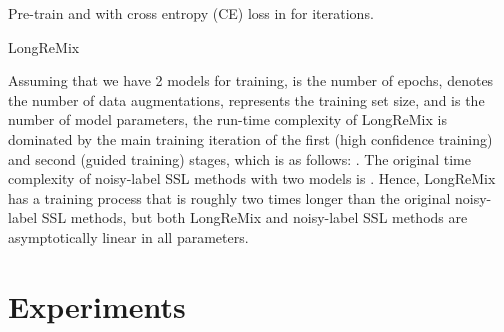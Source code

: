 \documentclass[review]{elsarticle}
\begin{document}
\begin{algorithm}[t!]
\scriptsize


Pre-train  and  with cross entropy (CE) loss in  for  iterations.\\
 \KwOutput{}
 \caption{LongReMix}
 \label{alg:LRM}
 
\end{algorithm}


Assuming that we have 2 models for training,  is the number of epochs,  denotes the number of data augmentations,  represents the training set size, and  is the number of model parameters, 
the run-time complexity of LongReMix is dominated by the main training iteration of the first (high confidence training) and second (guided training) stages, which is as follows: . The original time complexity of noisy-label SSL methods with two models is . Hence, LongReMix has a training process that is roughly two times longer than the original noisy-label SSL methods, but both LongReMix and noisy-label SSL methods are asymptotically linear in all parameters.


\section{Experiments}\label{sec:experiments}
\end{document}
